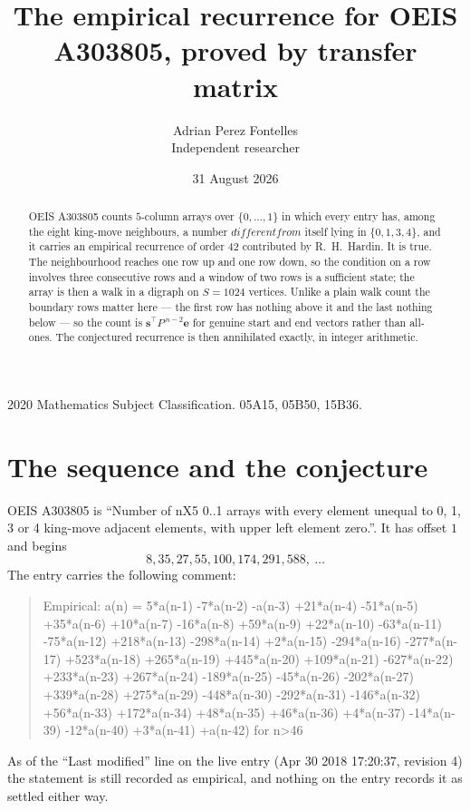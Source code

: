 \documentclass[11pt,a4paper]{article}
\title{The empirical recurrence for OEIS A303805, proved by transfer matrix}
\author{Adrian Perez Fontelles\\ \small Independent researcher}
\date{31 August 2026}
\theoremstyle{plain}
\theoremstyle{definition}
\begin{document}
\maketitle

\begin{abstract}
OEIS A303805 counts $5$-column arrays over $\{0,\dots,1\}$ in which every entry has,
among the eight king-move neighbours, a number $different from$ itself lying in $\{0,1,3,4\}$, and it carries an empirical
recurrence of order $42$ contributed by R.~H.~Hardin. It is true. The neighbourhood
reaches one row up and one row down, so the condition on a row involves three consecutive
rows and a window of two rows is a sufficient state; the array is then a walk in a digraph
on $S=1024$ vertices. Unlike a plain walk count the boundary rows matter here --- the first
row has nothing above it and the last nothing below --- so the count is
$\mathbf{s}^{\!\top}P^{\,n-2}\mathbf{e}$ for genuine start and end vectors rather than
all-ones. The conjectured recurrence is then annihilated exactly, in integer arithmetic.
\end{abstract}

\noindent\small 2020 Mathematics Subject Classification. 05A15, 05B50, 15B36.\normalsize

\section{The sequence and the conjecture}

OEIS A303805 is ``Number of nX5 0..1 arrays with every element unequal to 0, 1, 3 or 4 king-move adjacent elements, with upper left element zero.''. It has offset
$1$ and begins
\[
8, 35, 27, 55, 100, 174, 291, 588,\ \dots
\]
The entry carries the following comment:
\begin{quote}\small
Empirical: a(n) = 5*a(n-1) -7*a(n-2) -a(n-3) +21*a(n-4) -51*a(n-5) +35*a(n-6) +10*a(n-7) -16*a(n-8) +59*a(n-9) +22*a(n-10) -63*a(n-11) -75*a(n-12) +218*a(n-13) -298*a(n-14) +2*a(n-15) -294*a(n-16) -277*a(n-17) +523*a(n-18) +265*a(n-19) +445*a(n-20) +109*a(n-21) -627*a(n-22) +233*a(n-23) +267*a(n-24) -189*a(n-25) -45*a(n-26) -202*a(n-27) +339*a(n-28) +275*a(n-29) -448*a(n-30) -292*a(n-31) -146*a(n-32) +56*a(n-33) +172*a(n-34) +48*a(n-35) +46*a(n-36) +4*a(n-37) -14*a(n-39) -12*a(n-40) +3*a(n-41) +a(n-42) for n>46
\end{quote}
As of the ``Last modified'' line on the live entry (Apr 30 2018 17:20:37, revision
4) the statement is still recorded as empirical, and nothing on the entry
records it as settled either way.
\end{document}
